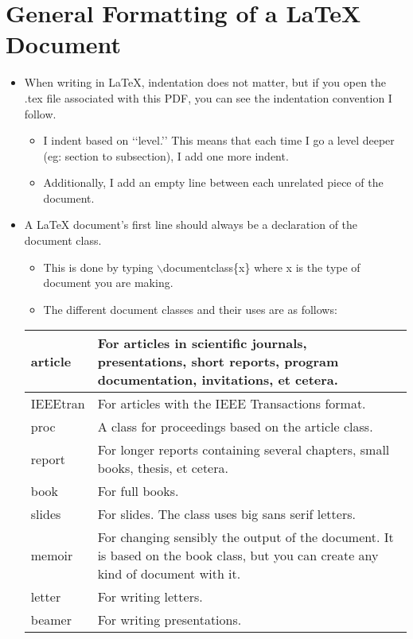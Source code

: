 \documentclass{article}
\begin{document}
	\section{General Formatting of a \LaTeX{} Document}
		\begin{itemize}
			\item When writing in \LaTeX{}, indentation does not matter, but if you open the .tex file associated with this PDF, you can see the indentation convention I follow.
			\begin{itemize}
				\item I indent based on \lq\lq{}level.\rq\rq{} This means that each time I go a level deeper (eg: section to subsection), I add one more indent.
				\item Additionally, I add an empty line between each unrelated piece of the document.
			\end{itemize}
			\item A \LaTeX{} document\rq{}s first line should always be a declaration of the document class.
			\begin{itemize}
				\item This is done by typing $\backslash$documentclass\{x\} where x is the type of document you are making.
				\item The different document classes and their uses are as follows:
			\end{itemize}
			\def\arraystretch{1.5}
			\begin{tabularx}{\textwidth}{|l|X|}
				\hline
				article & For articles in scientific journals, presentations, short reports, program documentation, invitations, et cetera.\\
				\hline
				IEEEtran & For articles with the IEEE Transactions format.\\
				\hline
				proc & A class for proceedings based on the article class.\\
				\hline
				report & For longer reports containing several chapters, small books, thesis, et cetera.\\
				\hline
				book & For full books.\\
				\hline
				slides & For slides. The class uses big sans serif letters.\\
				\hline
				memoir & For changing sensibly the output of the document. It is based on the book class, but you can create any kind of document with it.\\
				\hline
				letter & For writing letters.\\
				\hline
				beamer & For writing presentations.\\

\end{tabularx}
\end{itemize}
\end{document}
